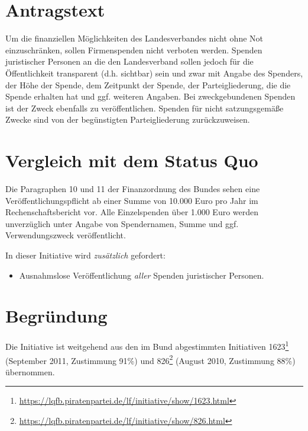 \section{Antragstext}

Um die finanziellen Möglichkeiten des Landesverbandes nicht ohne Not einzuschränken, sollen Firmenspenden nicht verboten werden. Spenden juristischer Personen an die den Landesverband sollen jedoch für die Öffentlichkeit transparent (d.h. sichtbar) sein und zwar mit Angabe des Spenders, der Höhe der Spende, dem Zeitpunkt der Spende, der Parteigliederung, die die Spende erhalten hat und ggf. weiteren Angaben. Bei zweckgebundenen Spenden ist der Zweck ebenfalls zu veröffentlichen. Spenden für nicht satzungsgemäße Zwecke sind von der begünstigten Parteigliederung zurückzuweisen.

\section{Vergleich mit dem Status Quo}

Die Paragraphen 10 und 11 der Finanzordnung des Bundes sehen eine Veröffentlichungspflicht ab einer Summe von 10.000 Euro pro Jahr im Rechenschaftsbericht vor. Alle Einzelspenden über 1.000 Euro werden unverzüglich unter Angabe von Spendernamen, Summe und ggf. Verwendungszweck veröffentlicht.

In dieser Initiative wird \emph{zusätzlich} gefordert:

\begin{itemize}
\item
  Ausnahmslose Veröffentlichung \emph{aller} Spenden juristischer Personen.
\end{itemize}
\section{Begründung}

Die Initiative ist weitgehend aus den im Bund abgestimmten Initiativen 1623\footnote{\url{https://lqfb.piratenpartei.de/lf/initiative/show/1623.html}} (September 2011, Zustimmung 91\%) und 826\footnote{\url{https://lqfb.piratenpartei.de/lf/initiative/show/826.html}} (August 2010, Zustimmung 88\%) übernommen.
